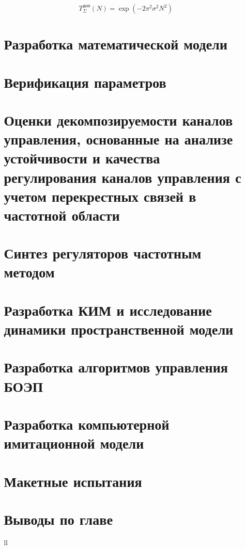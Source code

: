 \begin{equation}
\label{eq:p2:4}
\begin{alignedat}{2}
T_{\Sigma{}}^{\textit{доп}}\left(N\right)=\exp{\left(-2{\pi{}}^2{\sigma{}}^2N^2\right)}
\end{alignedat}
\end{equation}



\section{Разработка математической модели} \label{sec:ch2/sec3}

\section{Верификация параметров} \label{sec:ch2/sec4}

\section{Оценки декомпозируемости каналов управления, основанные на анализе устойчивости и качества регулирования каналов управления с учетом перекрестных связей в частотной области} \label{sec:ch2/sec5}

\section{Синтез регуляторов частотным методом} \label{sec:ch2/sec6}

\section{Разработка КИМ и исследование динамики пространственной модели} \label{sec:ch2/sec7}

\section{Разработка алгоритмов управления БОЭП} \label{sec:ch2/sec8}

\section{Разработка компьютерной имитационной модели} \label{sec:ch2/sec9}

\section{Макетные испытания} \label{sec:ch2/sec10}

\section{Выводы по главе} \label{sec:ch2/sec11}



ll
